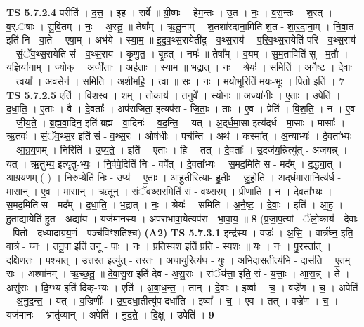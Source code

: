 \documentclass[17pt]{extarticle}
\begin{document}
                  \newline
                                \textbf{ TS 5.7.2.4} \newline
                  परीति॑ । द॒त्त॒ । इ॒ह । सर्वे᳚ ॥ ग्री॒ष्मः । हे॒म॒न्तः । उ॒त । नः॒ । व॒स॒न्तः । श॒रत् । व॒र्.॒षाः । सु॒वि॒तम् । नः॒ । अ॒स्तु॒ ॥ तेषा᳚म् । ऋ॒तू॒नाम् । श॒तशा॑रदाना॒मिति॑ श॒त - शा॒र॒दा॒ना॒म् । नि॒वा॒त इति॑ नि - वा॒ते । ए॒षा॒म् । अभ॑ये । स्या॒म॒ ॥ इ॒दु॒व॒थ्स॒रायेती॑दु - व॒थ्स॒राय॑ । प॒रि॒व॒थ्स॒रायेति॑ परि - व॒थ्स॒राय॑ । सं॒ॅव॒थ्स॒रायेति॑ सं - व॒थ्स॒राय॑ । कृ॒णु॒त॒ । बृ॒हत् । नमः॑ ॥ तेषा᳚म् । व॒यम् । सु॒म॒ताविति॑ सु - म॒तौ । य॒ज्ञिया॑नाम् । ज्योक् । अजी॑ताः । अह॑ताः । स्या॒म॒ ॥ भ॒द्रात् । नः॒ । श्रेयः॑ । समिति॑ । अ॒नै॒ष्ट॒ । दे॒वाः॒ । त्वया᳚ । अ॒व॒सेन॑ । समिति॑ । अ॒शी॒म॒हि॒ । त्वा॒ ॥ सः । नः॒ । म॒यो॒भूरिति॑ मयः-भूः । पि॒तो॒ इति॑ । \textbf{  7} \newline
                  \newline
                                \textbf{ TS 5.7.2.5} \newline
                  एति॑ । वि॒श॒स्व॒ । शम् । तो॒काय॑ । त॒नुवे᳚ । स्यो॒नः ॥ अज्या॑नीः । ए॒ताः । उपेति॑ । द॒धा॒ति॒ । ए॒ताः । वै । दे॒वताः᳚ । अप॑राजिता॒ इत्यप॑रा - जि॒ताः॒ । ताः । ए॒व । प्रेति॑ । वि॒श॒ति॒ । न । ए॒व । जी॒य॒ते॒ । ब्र॒ह्म॒वा॒दिन॒ इति॑ ब्रह्म - वा॒दिनः॑ । व॒द॒न्ति॒ । यत् । अ॒द्‌र्ध॒मा॒सा इत्य॑द्‌र्ध - मा॒साः । मासाः᳚ । ऋ॒तवः॑ । सं॒ॅव॒थ्स॒र इति॑ सं - व॒थ्स॒रः । ओष॑धीः । पच॑न्ति । अथ॑ । कस्मा᳚त् । अ॒न्याभ्यः॑ । दे॒वता᳚भ्यः । आ॒ग्र॒य॒णम् । निरिति॑ । उ॒प्य॒ते॒ । इति॑ । ए॒ताः । हि । तत् । दे॒वताः᳚ । उ॒दज॑य॒न्नित्यु॑त् - अज॑यन्न् । यत् । ऋ॒तुभ्य॒ इत्यृ॒तु-भ्यः॒ । नि॒र्वपे॒दिति॑ निः - वपे᳚त् । दे॒वता᳚भ्यः । स॒मद॒मिति॑ स - मद᳚म् । द॒द्ध्या॒त् । आ॒ग्र॒य॒णम् ( ) । नि॒रुप्येति॑ निः - उप्य॑ । ए॒ताः । आहु॑ती॒रित्या- हु॒तीः॒ । जु॒हो॒ति॒ । अ॒द्‌र्ध॒मा॒सानित्य॑र्ध - मा॒सान् । ए॒व । मासान्॑ । ऋ॒तून् । सं॒ॅव॒थ्स॒रमिति॑ सं - व॒थ्स॒रम् । प्री॒णा॒ति॒ । न । दे॒वता᳚भ्यः । स॒मद॒मिति॑ स - मद᳚म् । द॒धा॒ति॒ । भ॒द्रात् । नः॒ । श्रेयः॑ । समिति॑ । अ॒नै॒ष्ट॒ । दे॒वाः॒ । इति॑ । आ॒ह॒ । हु॒ताद्या॒येति॑ हुत - अद्या॑य । यज॑मानस्य । अप॑राभावा॒येत्यप॑रा - भा॒वा॒य॒ ॥ \textbf{  8} \newline
                  \newline
                      (प्र॒जा॒प॒त्यां - ॅलो॒काय॑ - देवाः - पितो - दध्यादाग्रय॒णं - पञ्च॑विꣳशतिश्च)  \textbf{(A2)} \newline \newline
                                \textbf{ TS 5.7.3.1} \newline
                  इन्द्र॑स्य । वज्रः॑ । अ॒सि॒ । वार्त्र॑घ्न॒ इति॒ वार्त्र॑ - घ्नः॒ । त॒नू॒पा इति॑ तनू - पाः । नः॒ । प्र॒ति॒स्प॒श इति॑ प्रति - स्प॒शः ॥ यः । नः॒ । पु॒रस्ता᳚त् । द॒क्षि॒ण॒तः । प॒श्चात् । उ॒त्त॒र॒त इत्यु॑त् - त॒र॒तः । अ॒घा॒युरित्य॑घ - युः । अ॒भि॒दास॒तीत्य॑भि - दास॑ति । ए॒तम् । सः । अश्मा॑नम् । ऋ॒च्छ॒तु॒ ॥ दे॒वा॒सु॒रा इति॑ देव - अ॒सु॒राः । संॅय॑त्ता॒ इति॒ सं - य॒त्ताः॒ । आ॒स॒न्न् । ते । असु॑राः । दि॒ग्भ्य इति॑ दिक्-भ्यः । एति॑ । अ॒बा॒ध॒न्त॒ । तान् । दे॒वाः । इष्वा᳚ । च॒ । वज्रे॑ण । च॒ । अपेति॑ । अ॒नु॒द॒न्त॒ । यत् । व॒ज्रिणीः᳚ । उ॒प॒दधा॒तीत्यु॑प-दधा॑ति । इष्वा᳚ । च॒ । ए॒व । तत् । वज्रे॑ण । च॒ । यज॑मानः । भ्रातृ॑व्यान् । अपेति॑ । नु॒द॒ते॒ । दि॒क्षु । उपेति॑ । \textbf{  9} \newline
\end{document}
